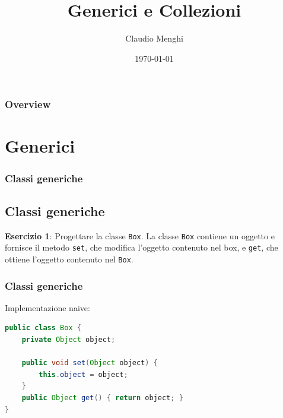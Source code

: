 \documentclass{beamer}
\title[Generici e Collezioni]{Generici e Collezioni} %
\author{Claudio Menghi} %
\institute[Polimi] %
{
Politecnico di Milano \\ %
\medskip
\textit{claudio.menghi@polimi.it} %
}
\date{\today} %
\begin{document}
\begin{frame}
\titlepage %
\end{frame}

\begin{frame}
\frametitle{Overview} %
\tableofcontents %
\end{frame}





\section{Generici}






\begin{frame}
\frametitle{Classi generiche}
\subsection{Classi generiche}
\begin{framed}
\textbf{Esercizio 1}: Progettare la classe \texttt{Box}. La classe \texttt{Box} contiene un oggetto e fornisce il metodo \texttt{set}, che modifica l'oggetto contenuto nel box, e  \texttt{get}, che ottiene l'oggetto contenuto nel \texttt{Box}.
\end{framed}
\end{frame}

\begin{frame}[fragile]
\frametitle{Classi generiche}
Implementazione naive:
\begin{framed}
\begin{lstlisting}[language=Java]
public class Box {
    private Object object;

    public void set(Object object) { 
        this.object = object; 
    }
    public Object get() { return object; }
}
\end{lstlisting}
\end{framed}
\end{frame}
\end{document}
